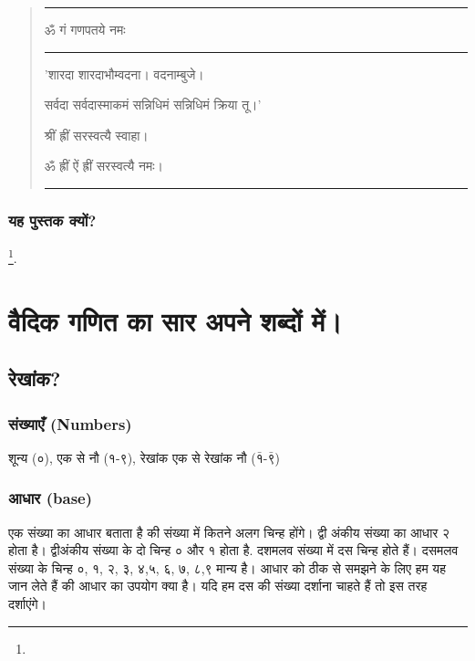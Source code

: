\documentclass[oneside,11pt]{memoir} %
\begin{document}
\begin{quote}

\noindent\rule{7.5cm}{0.4pt}

ॐ गं गणपतये नमः 

\noindent\rule{7.5cm}{0.4pt}

'शारदा शारदाभौम्वदना। वदनाम्बुजे।

सर्वदा सर्वदास्माकमं सन्निधिमं सन्निधिमं क्रिया तू।'

श्रीं ह्रीं सरस्वत्यै स्वाहा।

ॐ ह्रीं ऐं ह्रीं सरस्वत्यै नमः।

\noindent\rule{7.5cm}{0.4pt}


\end{quote}

\section{यह पुस्तक क्यों?}

 
\footnote{}.


\part{वैदिक गणित का सार अपने शब्दों में। }



\chapter{रेखांक?}

\section{संख्याएँ (Numbers)}
शून्य (०), एक से नौ (१-९), रेखांक एक से रेखांक नौ ($\bar{१}$-$\bar{९}$)
\section{आधार (base)}
एक संख्या का आधार बताता है की संख्या में कितने अलग चिन्ह होंगे। द्वी अंकीय संख्या का आधार २ होता है। द्वीअंकीय संख्या के दो चिन्ह ० और १ होता है. दशमलव संख्या में दस चिन्ह होते हैं। दसमलव संख्या के चिन्ह ०, १,  २, ३, ४,५,  ६, ७, ८,९ मान्य है। आधार को ठीक से समझने के लिए हम यह जान लेते हैं की आधार का उपयोग क्या है। यदि हम दस की संख्या दर्शाना चाहते हैं तो इस तरह दर्शाएंगे। 
\end{document}
